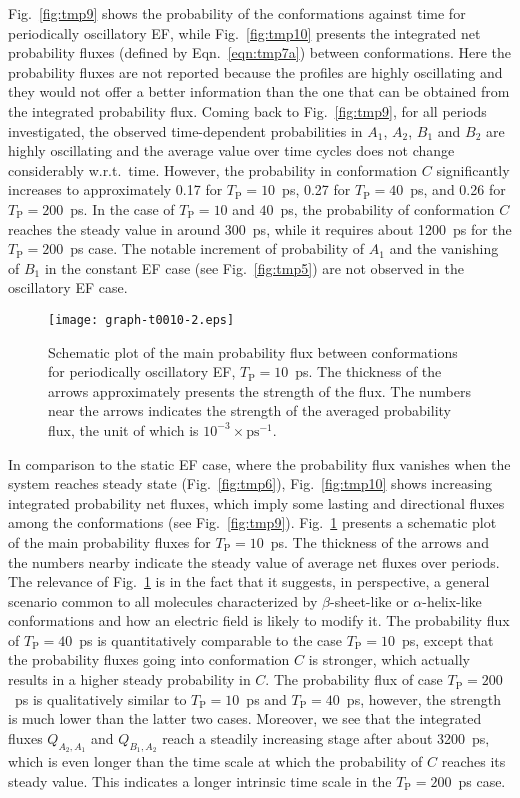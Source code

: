 \documentclass[a4paper,preprint,unsortedaddress,onecolumn]{revtex4-1}
\newcommand{\period}[0]{T_{\textrm{P}}}
\begin{document}
Fig.~\ref{fig:tmp9} shows the probability of the
conformations against time for periodically oscillatory EF,
while  
Fig.~\ref{fig:tmp10} presents the integrated net probability fluxes
(defined by Eqn.~\eqref{eqn:tmp7a}) between
conformations. Here the probability fluxes are not reported
because the profiles are highly oscillating and they would not offer 
a better information than the one that can be obtained from the integrated probability flux.
Coming back to Fig.~\ref{fig:tmp9}, for all periods investigated,
the observed time-dependent probabilities  in $A_1$, $A_2$, $B_1$ and $B_2$ are
highly oscillating and the average value over time cycles does not change
considerably w.r.t.~time.
However, the probability in conformation $C$ significantly
increases to approximately 0.17 for $\period =10$~ps, 0.27 for  $\period =40$~ps, and
0.26 for $\period =200$~ps.
In the case of $\period =10$ and $40$~ps, {the probability of conformation $C$}
reaches the steady value in around 300~ps, while it requires about 1200~ps
for the $\period =200$~ps case. 
The notable increment of probability of $A_1$ and
  the vanishing of $B_1$ in the constant EF case (see Fig.~\ref{fig:tmp5})
are not observed in the oscillatory EF case.
\begin{figure}
  \centering
  \texttt{[image: graph-t0010-2.eps]}
  \caption{Schematic plot of the main probability flux between conformations
    for periodically oscillatory EF, $\period =10$~ps. The thickness 
    of the arrows approximately presents the strength of the flux.
    The numbers near the arrows indicates the strength of the averaged
    probability flux, the unit of which is $10^{-3}\times\textrm{ps}^{-1}$.
  }
  \label{fig:tmp11}
\end{figure}
In comparison to the static EF case, where the probability flux
vanishes when the system reaches steady state (Fig.~\ref{fig:tmp6}), 
Fig.~\ref{fig:tmp10} shows increasing
integrated probability net fluxes, which imply some lasting and directional
fluxes among the conformations (see Fig.~\ref{fig:tmp9}).
Fig.~\ref{fig:tmp11} presents
a schematic plot of the main probability fluxes for $\period =10$~ps.
The thickness of the arrows and the numbers nearby indicate
the steady value of average net fluxes over periods.
{
The relevance of Fig.~\ref{fig:tmp11} is in the fact that it suggests,
in perspective, a general scenario common to all molecules
characterized by $\beta$-sheet-like or $\alpha$-helix-like
conformations and how an electric field is likely to modify it.
}
The probability flux of $\period =40$~ps is quantitatively
comparable to the case $\period =10$~ps, except that the probability fluxes
going into conformation $C$ is stronger, which actually results in
a higher steady probability in $C$.
The probability flux of case $\period =200$~ps is qualitatively
similar to $\period =10$~ps and $\period =40$~ps, however,
the strength is much lower than the latter two cases.
Moreover, 
  we see that the integrated fluxes $Q_{A_2,A_1}$ and $Q_{B_1,A_2}$ reach
  a steadily
increasing stage after about 3200~ps, which is even longer than the time scale
at which the probability of $C$ reaches its steady value. This indicates
a longer intrinsic time scale in the $\period =200$~ps case.
\end{document}
